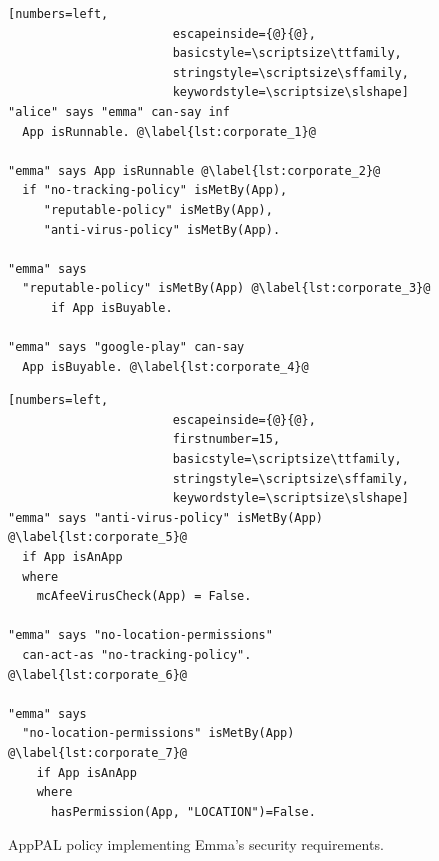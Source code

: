 \documentclass[]{llncs}
\begin{document}
\begin{figure}
  \begin{minipage}[t]{0.5\textwidth}
    \begin{lstlisting}[numbers=left,
                       escapeinside={@}{@},
                       basicstyle=\scriptsize\ttfamily,
                       stringstyle=\scriptsize\sffamily,
                       keywordstyle=\scriptsize\slshape]
"alice" says "emma" can-say inf
  App isRunnable. @\label{lst:corporate_1}@

"emma" says App isRunnable @\label{lst:corporate_2}@
  if "no-tracking-policy" isMetBy(App),
     "reputable-policy" isMetBy(App),
     "anti-virus-policy" isMetBy(App).

"emma" says
  "reputable-policy" isMetBy(App) @\label{lst:corporate_3}@
      if App isBuyable.

"emma" says "google-play" can-say
  App isBuyable. @\label{lst:corporate_4}@
    \end{lstlisting}
  \end{minipage}\begin{minipage}[t]{0.5\textwidth}
    \begin{lstlisting}[numbers=left,
                       escapeinside={@}{@},
                       firstnumber=15,
                       basicstyle=\scriptsize\ttfamily,
                       stringstyle=\scriptsize\sffamily,
                       keywordstyle=\scriptsize\slshape]
"emma" says "anti-virus-policy" isMetBy(App) @\label{lst:corporate_5}@
  if App isAnApp
  where
    mcAfeeVirusCheck(App) = False.

"emma" says "no-location-permissions"
  can-act-as "no-tracking-policy". @\label{lst:corporate_6}@

"emma" says
  "no-location-permissions" isMetBy(App) @\label{lst:corporate_7}@
    if App isAnApp
    where
      hasPermission(App, "LOCATION")=False.
\end{lstlisting}
\end{minipage}
\caption{AppPAL policy implementing Emma's security requirements.}
\label{lst:corporate}
\end{figure}
\end{document}
